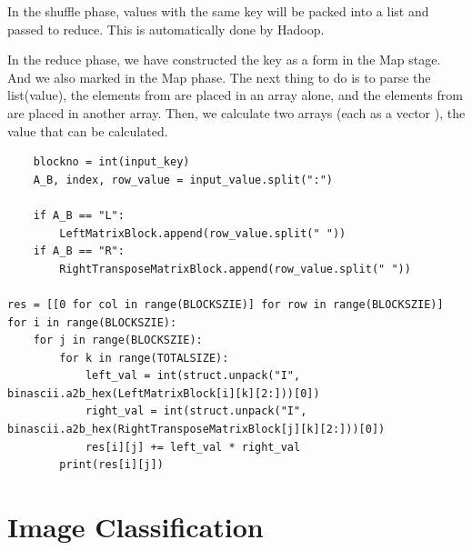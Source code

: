 In the shuffle phase, values with the same key will be packed into a list and passed to reduce. This is automatically done by Hadoop. 

In the reduce phase, we have constructed the key as a form in the Map stage. And we also marked in the Map phase. The next thing to do is to parse the list(value), the elements from are placed in an array alone, and the elements from are placed in another array. Then, we calculate two arrays (each as a vector ), the value that can be calculated.

\lstset{language=Python}
\begin{lstlisting}
    blockno = int(input_key)
    A_B, index, row_value = input_value.split(":")

    if A_B == "L":
        LeftMatrixBlock.append(row_value.split(" "))
    if A_B == "R":
        RightTransposeMatrixBlock.append(row_value.split(" "))

res = [[0 for col in range(BLOCKSZIE)] for row in range(BLOCKSZIE)]
for i in range(BLOCKSZIE):
    for j in range(BLOCKSZIE):
        for k in range(TOTALSIZE):
            left_val = int(struct.unpack("I", binascii.a2b_hex(LeftMatrixBlock[i][k][2:]))[0])
            right_val = int(struct.unpack("I", binascii.a2b_hex(RightTransposeMatrixBlock[j][k][2:]))[0])
            res[i][j] += left_val * right_val
        print(res[i][j])
\end{lstlisting}

\section{Image Classification}
